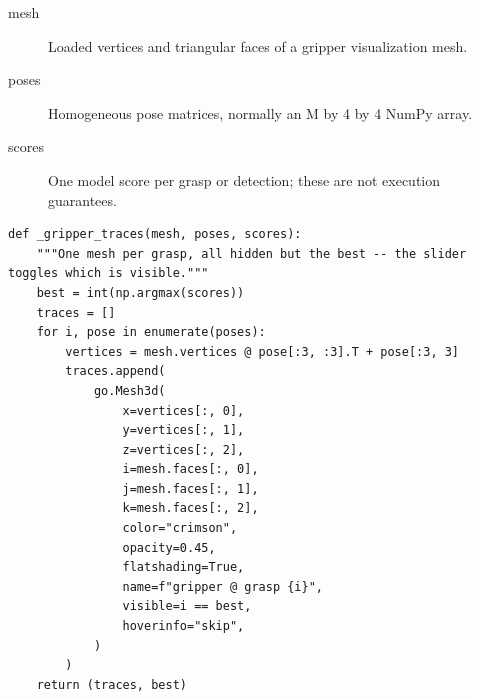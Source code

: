 \documentclass[11pt,a4paper]{book}
\begin{document}
\begin{description}
\item[mesh] Loaded vertices and triangular faces of a gripper visualization mesh.
\item[poses] Homogeneous pose matrices, normally an M by 4 by 4 NumPy array.
\item[scores] One model score per grasp or detection; these are not execution guarantees.
\end{description}

\begin{lstlisting}[firstnumber=129]
def _gripper_traces(mesh, poses, scores):
    """One mesh per grasp, all hidden but the best -- the slider toggles which is visible."""
    best = int(np.argmax(scores))
    traces = []
    for i, pose in enumerate(poses):
        vertices = mesh.vertices @ pose[:3, :3].T + pose[:3, 3]
        traces.append(
            go.Mesh3d(
                x=vertices[:, 0],
                y=vertices[:, 1],
                z=vertices[:, 2],
                i=mesh.faces[:, 0],
                j=mesh.faces[:, 1],
                k=mesh.faces[:, 2],
                color="crimson",
                opacity=0.45,
                flatshading=True,
                name=f"gripper @ grasp {i}",
                visible=i == best,
                hoverinfo="skip",
            )
        )
    return (traces, best)


\end{lstlisting}
\end{document}
